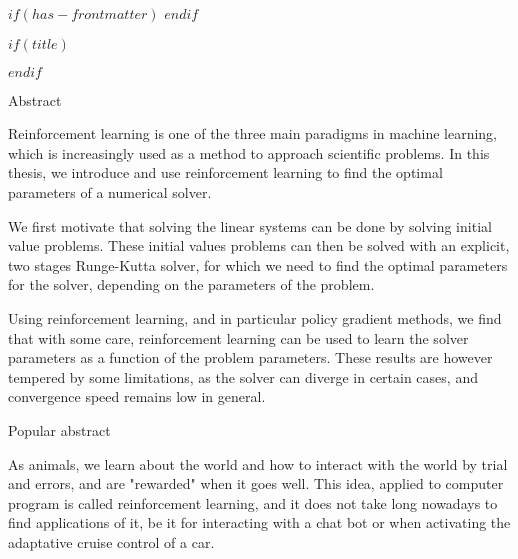 $if(has-frontmatter)$
\frontmatter
$endif$

$if(title)$
\maketitle
$endif$

\newpage


\begin{center}
\huge{Abstract}
\end{center}

\vspace*{\baselineskip}

Reinforcement learning is one of the three main paradigms in machine learning, which is increasingly used as a method to approach scientific problems. In this thesis, we introduce and use reinforcement learning to find the optimal parameters of a numerical solver.

We first motivate that solving the linear systems can be done by solving initial value problems. These initial values problems can then be solved with an explicit, two stages Runge-Kutta solver, for which we need to find the optimal parameters for the solver, depending on the parameters of the problem.   

Using reinforcement learning, and in particular policy gradient methods, we find that with some care, reinforcement learning can be used to learn the 
solver parameters as a function of the problem parameters. These results are however tempered by some limitations, as the solver can diverge in certain cases, and convergence speed remains low in general.

\vspace*{\baselineskip}

\begin{center}
\huge{Popular abstract}
\end{center}

\vspace*{\baselineskip}

As animals, we learn about the world and how to interact with the world by trial and errors, and are "rewarded" when it goes well. This idea, applied to computer program is called reinforcement learning, and it does not take long nowadays to find applications of it, be it for interacting with a chat bot or when activating the adaptative cruise control of a car.

